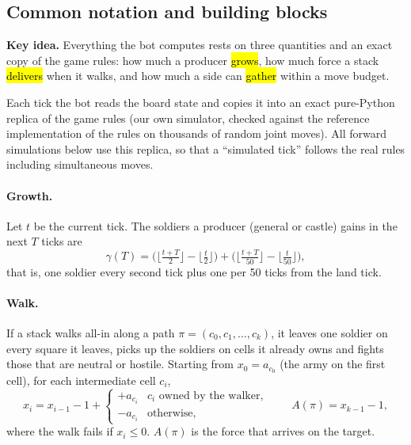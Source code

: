 \subsection{Common notation and building blocks}\label{sec:notation}

\begin{keyidea}
\textbf{Key idea.} Everything the bot computes rests on three quantities and an exact copy of the game rules:
how much a producer \hl{grows}, how much force a stack \hl{delivers} when it walks, and how much a side can
\hl{gather} within a move budget.
\end{keyidea}

Each tick the bot reads the board state and copies it into an exact pure-Python replica of the game rules
(our own simulator, checked against the reference implementation of the rules on thousands of random joint
moves). All forward simulations below use this replica, so that a ``simulated tick'' follows the real rules
including simultaneous moves.

\paragraph{Growth.} Let $t$ be the current tick. The soldiers a producer (general or castle) gains in the
next $T$ ticks are
\begin{equation}
\gamma(T)=\Big(\big\lfloor\tfrac{t+T}{2}\big\rfloor-\big\lfloor\tfrac{t}{2}\big\rfloor\Big)
+\Big(\big\lfloor\tfrac{t+T}{50}\big\rfloor-\big\lfloor\tfrac{t}{50}\big\rfloor\Big),
\end{equation}
that is, one soldier every second tick plus one per 50 ticks from the land tick.

\paragraph{Walk.} If a stack walks all-in along a path $\pi=(c_0,c_1,\dots,c_k)$, it leaves one soldier on
every square it leaves, picks up the soldiers on cells it already owns and fights those that are neutral or
hostile. Starting from $x_0=a_{c_0}$ (the army on the first cell), for each intermediate cell $c_i$,
\begin{equation}
x_i=x_{i-1}-1+\begin{cases}+a_{c_i} & c_i\text{ owned by the walker},\\ -a_{c_i} & \text{otherwise},\end{cases}
\qquad A(\pi)=x_{k-1}-1,
\end{equation}
where the walk fails if $x_i\le 0$. $A(\pi)$ is the force that arrives on the target.

